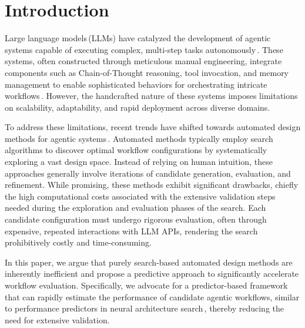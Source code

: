 \section{Introduction} \label{section:introduction}

Large language models\,(LLMs) have catalyzed the development of agentic systems capable of executing complex, multi-step tasks autonomously\,\citep{MetaGPT_ICLR_24, AutoGen_COLM_24, AgentGym_24, GAIA_ICLR_24}. These systems, often constructed through meticulous manual engineering, integrate components such as Chain-of-Thought reasoning, tool invocation, and memory management to enable sophisticated behaviors for orchestrating intricate workflows\,\citep{rise_agent_survey_25, LLMReasoning_Survey_25, AgenticAI_Survey_25, ALLM_Survey_25}. However, the handcrafted nature of these systems imposes limitations on scalability, adaptability, and rapid deployment across diverse domains.


To address these limitations, recent trends have shifted towards automated design methods for agentic systems\,\citep{ADAS_ICLR_25, AgentSquare_ICLR_25, AFlow_ICLR_25, GPTSwarm_ICML24, DyLAN_COLM_24, EvoMAC_ICLR_25, EvoAgent_NAACL_25}. Automated methods typically employ search algorithms to discover optimal workflow configurations by systematically exploring a vast design space. Instead of relying on human intuition, these approaches generally involve iterations of candidate generation, evaluation, and refinement. While promising, these methods exhibit significant drawbacks, chiefly the high computational costs associated with the extensive validation steps needed during the exploration and evaluation phases of the search. Each candidate configuration must undergo rigorous evaluation, often through expensive, repeated interactions with LLM APIs, rendering the search prohibitively costly and time-consuming.


In this paper, we argue that purely search-based automated design methods are inherently inefficient and propose a predictive approach to significantly accelerate workflow evaluation. Specifically, we advocate for a predictor-based framework that can rapidly estimate the performance of candidate agentic workflows, similar to performance predictors in neural architecture search\,\citep{powerful_nas_predictor_NeurIPS_21}, thereby reducing the need for extensive validation. 

